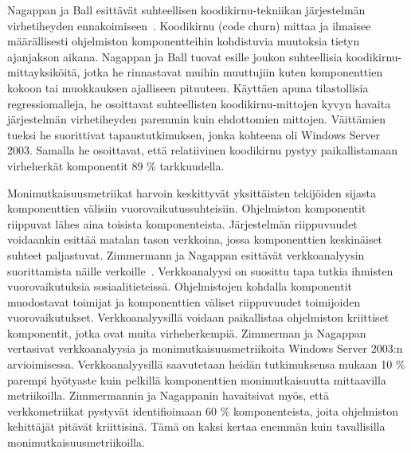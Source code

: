 \documentclass[finnish]{../tktltiki2}
\theoremstyle{definition}
\theoremstyle{remark}
\begin{document}
    Nagappan ja Ball esittävät suhteellisen koodikirnu-tekniikan järjestelmän virhetiheyden ennakoimiseen~\cite{NB05}. 
Koodikirnu (code churn) mittaa ja ilmaisee määrällisesti ohjelmiston komponentteihin kohdistuvia muutoksia tietyn 
ajanjakson aikana. Nagappan ja Ball tuovat esille joukon suhteellisia koodikirnu-mittayksiköitä, jotka he rinnastavat 
muihin muuttujiin kuten komponenttien kokoon tai muokkauksen ajalliseen pituuteen. Käyttäen apuna tilastollisia 
regressiomalleja, he osoittavat suhteellisten koodikirnu-mittojen kyvyn havaita järjestelmän virhetiheyden paremmin kuin 
ehdottomien mittojen. Väittämien tueksi he suorittivat tapaustutkimuksen, jonka kohteena oli Windows Server 2003. 
Samalla he osoittavat, että relatiivinen koodikirnu pystyy paikallistamaan virheherkät komponentit 89 \% tarkkuudella.

    Monimutkaisuusmetriikat harvoin keskittyvät yksittäisten tekijöiden sijasta komponenttien välisiin 
vuorovaikutussuhteisiin. Ohjelmiston komponentit riippuvat lähes aina toisista komponenteista. Järjestelmän riippuvuudet 
voidaankin esittää matalan tason verkkoina, jossa komponenttien keskinäiset suhteet paljastuvat. Zimmermann ja Nagappan 
esittävät verkkoanalyysin suorittamista näille verkoille~\cite{ZN08}. Verkkoanalyysi on suosittu tapa tutkia ihmisten 
vuorovaikutuksia sosiaalitieteissä. Ohjelmistojen kohdalla komponentit muodostavat toimijat ja komponenttien väliset 
riippuvuudet toimijoiden vuorovaikutukset. Verkkoanalyysillä voidaan paikallistaa ohjelmiston kriittiset komponentit, 
jotka ovat muita virheherkempiä.  Zimmerman ja Nagappan vertasivat verkkoanalyysia ja monimutkaisuusmetriikoita Windows 
Server 2003:n arvioimisessa. Verkkoanalyysillä saavutetaan heidän tutkimuksensa mukaan 10 \% parempi hyötyaste kuin 
pelkillä komponenttien monimutkaisuutta mittaavilla metriikoilla. Zimmermannin ja Nagappanin havaitsivat myös, että 
verkkometriikat pystyvät identifioimaan 60 \% komponenteista, joita ohjelmiston kehittäjät pitävät kriittisinä. Tämä on 
kaksi kertaa enemmän kuin tavallisilla monimutkaisuusmetriikoilla.
\end{document}
